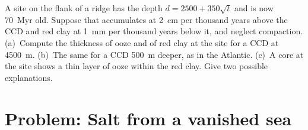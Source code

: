 \begin{exercise}[$\star\star\star$]\label{exo:b1:chemical-biogenic-sediments:12}
A site on the flank of a ridge has the depth $d = 2500 + 350\sqrt t$ and is now
\qty{70}{Myr} old. Suppose that  accumulates at \qty{2}{cm} per
thousand years above the CCD and red clay at \qty{1}{mm} per thousand years
below it, and neglect compaction. (a)~Compute the thickness of ooze and of red
clay at the site for a CCD at \qty{4500}{m}. (b)~The same for a CCD
\qty{500}{m} deeper, as in the Atlantic. (c)~A core at the site shows a thin
layer of ooze within the red clay. Give two possible explanations.
\end{exercise}

\section{Problem: Salt from a vanished sea}

